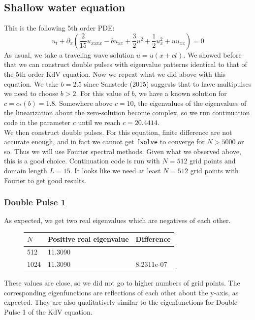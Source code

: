 \documentclass[12pt]{article}
\begin{document}
\subsection*{Shallow water equation}
This is the following 5th order PDE:
\[
u_t + \partial _x\left( \frac{2}{15}u_{xxxx} - b u_{xx} + \frac{3}{2}u^2 + \frac{1}{2}u_x^2 + u u_{xx} \right) = 0
\]
As usual, we take a traveling wave solution $u = u(x + ct)$. We showed before that we can construct double pulses with eigenvalue patterns identical to that of the 5th order KdV equation. Now we repeat what we did above with this equation. We take $b = 2.5$ since Sanstede (2015) suggests that to have multipulses we need to choose $b > 2$. For this value of $b$, we have a known solution for $c = c_*(b) = 1.8$. Somewhere above $c = 10$, the eigenvalues of the eigenvalues of the linearization about the zero-solution become complex, so we run continuation code in the parameter $c$ until we reach $c = 20.4414$. \\

We then construct double pulses. For this equation, finite difference are not accurate enough, and in fact we cannot get \texttt{fsolve} to converge for $N > 5000$ or so. Thus we will use Fourier spectral methods. Given what we observed above, this is a good choice. Continuation code is run with $N = 512$ grid points and domain length $L = 15$. It looks like we need at least $N = 512$ grid points with Fourier to get good results.

\subsubsection*{Double Pulse 1}
As expected, we get two real eigenvalues which are negatives of each other.
\begin{figure}[H]
\begin{tabular}{l|ll}
$N$    & Positive real eigenvalue      &  Difference      \\ \hline
  512  &        11.3090  &                  \\ 
  1024 &        11.3090  &      8.2311e-07  \\
\end{tabular}
\end{figure}
These values are close, so we did not go to higher numbers of grid points. The corresponding eigenfunctions are reflections of each other about the y-axis, as expected. They are also qualitatively similar to the eigenfunctions for Double Pulse 1 of the KdV equation.
\end{document}

